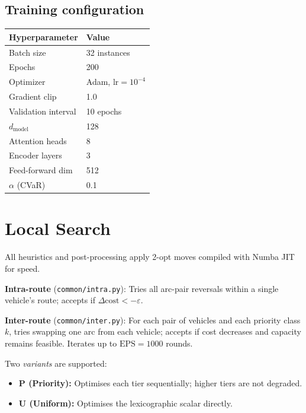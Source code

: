 \documentclass[11pt,a4paper]{article}
\begin{document}
\subsection{Training configuration}

\begin{center}
\begin{tabular}{ll}
\toprule
\textbf{Hyperparameter} & \textbf{Value} \\
\midrule
Batch size          & 32 instances \\
Epochs              & 200 \\
Optimizer           & Adam, $\text{lr}=10^{-4}$ \\
Gradient clip       & 1.0 \\
Validation interval & 10 epochs \\
$d_\text{model}$    & 128 \\
Attention heads     & 8 \\
Encoder layers      & 3 \\
Feed-forward dim    & 512 \\
$\alpha$ (CVaR)     & 0.1 \\
\bottomrule
\end{tabular}
\end{center}

\section{Local Search}

All heuristics and post-processing apply 2-opt moves compiled with Numba JIT
for speed.

\textbf{Intra-route} (\texttt{common/intra.py}): Tries all arc-pair reversals
within a single vehicle's route; accepts if $\Delta\text{cost} < -\varepsilon$.

\textbf{Inter-route} (\texttt{common/inter.py}): For each pair of vehicles and
each priority class $k$, tries swapping one arc from each vehicle; accepts if
cost decreases and capacity remains feasible. Iterates up to
$\text{EPS}=1000$ rounds.

Two \emph{variants} are supported:
\begin{itemize}[nosep]
  \item \textbf{P (Priority):} Optimises each tier sequentially; higher tiers
        are not degraded.
  \item \textbf{U (Uniform):} Optimises the lexicographic scalar directly.
\end{itemize}
\end{document}
